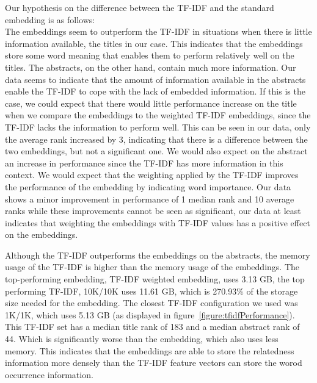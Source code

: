 \documentclass[../../Thesis.tex]{subfiles}
\begin{document}
\begin{jumpin}
Our hypothesis on the difference between the TF-IDF and the standard embedding is as follows:\\
The embeddings seem to outperform the TF-IDF in situations when there is little information available, the titles in our case. This indicates that the embeddings store some word meaning that enables them to perform relatively well on the titles. The abstracts, on the other hand, contain much more information. Our data seems to indicate that the amount of information available in the abstracts enable the TF-IDF to cope with the lack of embedded information. 
If this is the case, we could expect that there would little performance increase on the title when we compare the embeddings to the weighted TF-IDF embeddings, since the TF-IDF lacks the information to perform well. This can be seen in our data, only the average rank increased by 3, indicating that there is a difference between the two embeddings, but not a significant one. We would also expect on the abstract an increase in performance since the TF-IDF has more information in this context. We would expect that the weighting applied by the TF-IDF improves the performance of the embedding by indicating word importance. Our data shows a minor improvement in performance of 1 median rank and 10 average ranks while these improvements cannot be seen as significant, our data at least indicates that weighting the embeddings with TF-IDF values has a positive effect on the embeddings.

Although the TF-IDF outperforms the embeddings on the abstracts, the memory usage of the TF-IDF is higher than the memory usage of the embeddings. The top-performing embedding, TF-IDF weighted embedding, uses 3.13 GB, the top performing TF-IDF, 10K/10K uses 11.61 GB, which is 270.93\% of the storage size needed for the embedding. The closest TF-IDF configuration we used was 1K/1K, which uses 5.13 GB (as displayed in figure~\ref{figure:tfidfPerformance}). This TF-IDF set has a median title rank of 183 and a median abstract rank of 44. Which is significantly worse than the embedding, which also uses less memory. This indicates that the embeddings are able to store the relatedness information more densely than the TF-IDF feature vectors can store the worod occurrence information.


\end{jumpin}
\end{document}
